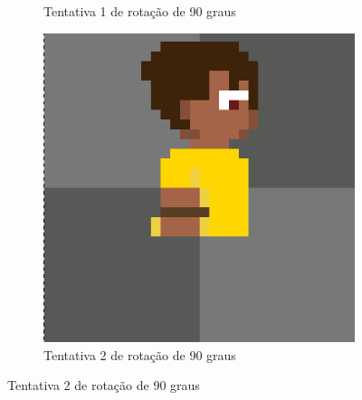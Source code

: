 \begin{figure}[htbp]
\begin{subfigure}{0.32\linewidth}
        \caption{\small Tentativa 1 de rotação de 90 graus}
        \label{fig:pixelLabRot6b}
    \end{subfigure}
    \begin{subfigure}{0.32\linewidth}
        \includegraphics[width=1\linewidth]{figs/pixelLab/dia2/rot45fix4res2.PNG}
        \caption{\small Tentativa 2 de rotação de 90 graus}
        \label{fig:pixelLabRot6c}
    \end{subfigure}
\end{figure}

